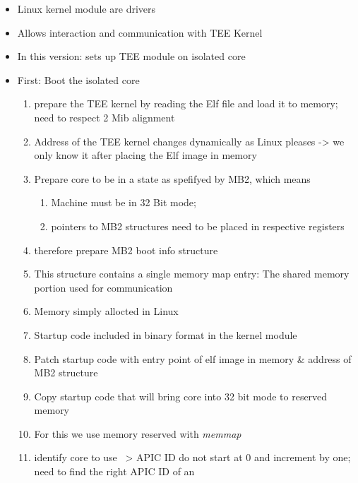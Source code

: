 \begin{itemize}
    \item Linux kernel module are drivers
    \item Allows interaction and communication with TEE Kernel
    \item In this version: sets up TEE module on isolated core
    \item First: Boot the isolated core
          \begin{enumerate}
              \item prepare the TEE kernel by reading the Elf file and load it
                    to
                    memory; need to respect 2 Mib alignment
              \item Address of the TEE kernel changes dynamically as Linux
                    pleases
                    -> we only know it after placing the Elf image in memory
              \item Prepare core to be in a state as spefifyed by MB2, which
                    means
                    \begin{enumerate}
                        \item Machine must be in 32 Bit mode;
                        \item pointers to MB2 structures need to be placed in
                              respective registers
                    \end{enumerate}
              \item therefore prepare MB2 boot info structure
              \item This structure contains a single memory map entry: The
                    shared memory portion used for communication
              \item Memory simply allocted in Linux
              \item Startup code included in binary format in the kernel module
              \item Patch startup code with entry point of elf image in memory
                    \& address of MB2 structure
              \item Copy startup code that will bring core into 32 bit mode to
                    reserved memory
              \item For this we use memory reserved with \textit{memmap}
              \item identify core to use ~> APIC ID do not start at 0 and
                    increment by one; need to find the right APIC ID of an

\end{enumerate}
\end{itemize}
